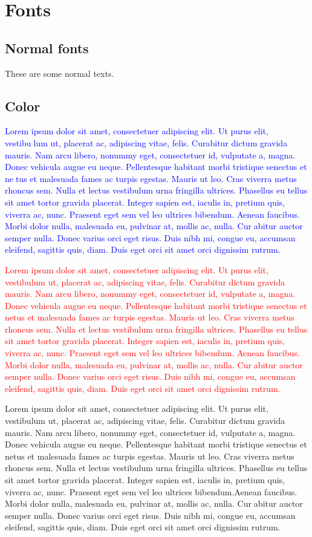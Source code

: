 \documentclass[18pt]{article}
\begin{document}
\section{Fonts}
  \subsection{Normal fonts}
   These are some normal texts.
  \subsection{Color}
  \textcolor{blue}{Lorem ipsum dolor sit amet, consectetuer adipiscing elit. Ut purus elit, vestibulum ut, placerat ac, adipiscing vitae, felis. Curabitur dictum gravida mauris.
Nam arcu libero, nonummy eget, consectetuer id, vulputate a, magna. Donec
vehicula augue eu neque. Pellentesque habitant morbi tristique senectus et netus et malesuada fames ac turpis egestas. Mauris ut leo. Cras viverra metus
rhoncus sem. Nulla et lectus vestibulum urna fringilla ultrices. Phasellus eu
tellus sit amet tortor gravida placerat. Integer sapien est, iaculis in, pretium
quis, viverra ac, nunc. Praesent eget sem vel leo ultrices bibendum. Aenean
faucibus. Morbi dolor nulla, malesuada eu, pulvinar at, mollis ac, nulla. Curabitur auctor semper nulla. Donec varius orci eget risus. Duis nibh mi, congue
eu, accumsan eleifend, sagittis quis, diam. Duis eget orci sit amet orci dignissim
rutrum.}

\textcolor{red}{  Lorem ipsum dolor sit amet, consectetuer adipiscing elit. Ut purus elit,
vestibulum ut, placerat ac, adipiscing vitae, felis. Curabitur dictum gravida
mauris. Nam arcu libero, nonummy eget, consectetuer id, vulputate a, magna.
Donec vehicula augue eu neque. Pellentesque habitant morbi tristique senectus
et netus et malesuada fames ac turpis egestas. Mauris ut leo. Cras viverra
metus rhoncus sem. Nulla et lectus vestibulum urna fringilla ultrices. Phasellus
eu tellus sit amet tortor gravida placerat. Integer sapien est, iaculis in, pretium
quis, viverra ac, nunc. Praesent eget sem vel leo ultrices bibendum. Aenean
faucibus. Morbi dolor nulla, malesuada eu, pulvinar at, mollis ac, nulla. Curabitur auctor semper nulla. Donec varius orci eget risus. Duis nibh mi, congue
eu, accumsan eleifend, sagittis quis, diam. Duis eget orci sit amet orci dignissim
rutrum.}

   Lorem ipsum dolor sit amet, consectetuer adipiscing elit. Ut purus elit,
vestibulum ut, placerat ac, adipiscing vitae, felis. Curabitur dictum gravida
mauris. Nam arcu libero, nonummy eget, consectetuer id, vulputate a, magna.
Donec vehicula augue eu neque. Pellentesque habitant morbi tristique senectus
et netus et malesuada fames ac turpis egestas. Mauris ut leo. Cras viverra
metus rhoncus sem. Nulla et lectus vestibulum urna fringilla ultrices. Phasellus
eu tellus sit amet tortor gravida placerat. Integer sapien est, iaculis in, pretium
quis, viverra ac, nunc. Praesent eget sem vel leo ultrices bibendum.Aenean faucibus. Morbi dolor nulla, malesuada eu, pulvinar at, mollis ac, nulla. Curabitur auctor semper nulla. Donec varius orci eget risus. Duis nibh mi, congue
eu, accumsan eleifend, sagittis quis, diam. Duis eget orci sit amet orci dignissim
rutrum.
\end{document}
